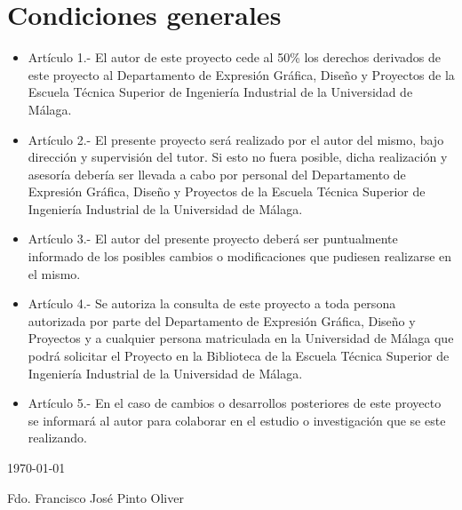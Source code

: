 \chapter{Condiciones generales}
\begin{itemize}
\item Artículo 1.- El autor de este proyecto cede al 50\% los derechos derivados de este proyecto al Departamento de Expresión Gráfica, Diseño y Proyectos de la Escuela Técnica Superior de Ingeniería Industrial de la Universidad de Málaga.

\item Artículo 2.- El presente proyecto será realizado por el autor del mismo, bajo dirección y supervisión del tutor. Si esto no fuera posible, dicha realización y asesoría debería ser llevada a cabo por personal del Departamento de Expresión Gráfica, Diseño y Proyectos de la Escuela Técnica Superior de Ingeniería Industrial de la Universidad de Málaga.

\item Artículo 3.- El autor del presente proyecto deberá ser puntualmente informado de los posibles cambios o modificaciones que pudiesen realizarse en el mismo.

\item Artículo 4.- Se autoriza la consulta de este proyecto a toda persona autorizada por parte del Departamento de Expresión Gráfica, Diseño y Proyectos y a cualquier persona matriculada en la Universidad de Málaga que podrá solicitar el Proyecto en la Biblioteca de la Escuela Técnica Superior de Ingeniería Industrial de la Universidad de Málaga.

\item Artículo 5.- En el caso de cambios o desarrollos posteriores de este proyecto se informará al autor para colaborar en el estudio o investigación que se este realizando.
\end{itemize}

\today

\begin{flushright}
Fdo. Francisco José Pinto Oliver
\end{flushright}
\vfill

